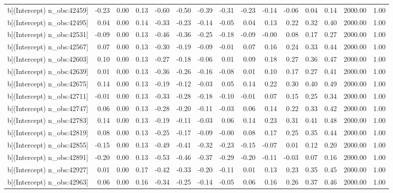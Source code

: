 \begin{table}[ht]
\begin{tabular}{rrrrrrrrrrrrrrr}
  b[(Intercept) n\_obs:42459] & -0.23 & 0.00 & 0.13 & -0.60 & -0.50 & -0.39 & -0.31 & -0.23 & -0.14 & -0.06 & 0.04 & 0.14 & 2000.00 & 1.00 \\ 
  b[(Intercept) n\_obs:42495] & 0.04 & 0.00 & 0.14 & -0.33 & -0.23 & -0.14 & -0.05 & 0.04 & 0.13 & 0.22 & 0.32 & 0.40 & 2000.00 & 1.00 \\ 
  b[(Intercept) n\_obs:42531] & -0.09 & 0.00 & 0.13 & -0.46 & -0.36 & -0.25 & -0.18 & -0.09 & -0.00 & 0.08 & 0.17 & 0.27 & 2000.00 & 1.00 \\ 
  b[(Intercept) n\_obs:42567] & 0.07 & 0.00 & 0.13 & -0.30 & -0.19 & -0.09 & -0.01 & 0.07 & 0.16 & 0.24 & 0.33 & 0.44 & 2000.00 & 1.00 \\ 
  b[(Intercept) n\_obs:42603] & 0.10 & 0.00 & 0.13 & -0.27 & -0.18 & -0.06 & 0.01 & 0.09 & 0.18 & 0.27 & 0.36 & 0.47 & 2000.00 & 1.00 \\ 
  b[(Intercept) n\_obs:42639] & 0.01 & 0.00 & 0.13 & -0.36 & -0.26 & -0.16 & -0.08 & 0.01 & 0.10 & 0.17 & 0.27 & 0.41 & 2000.00 & 1.00 \\ 
  b[(Intercept) n\_obs:42675] & 0.14 & 0.00 & 0.13 & -0.19 & -0.12 & -0.03 & 0.05 & 0.14 & 0.22 & 0.30 & 0.40 & 0.49 & 2000.00 & 1.00 \\ 
  b[(Intercept) n\_obs:42711] & -0.01 & 0.00 & 0.13 & -0.33 & -0.28 & -0.18 & -0.10 & -0.01 & 0.07 & 0.15 & 0.25 & 0.34 & 2000.00 & 1.00 \\ 
  b[(Intercept) n\_obs:42747] & 0.06 & 0.00 & 0.13 & -0.28 & -0.20 & -0.11 & -0.03 & 0.06 & 0.14 & 0.22 & 0.33 & 0.42 & 2000.00 & 1.00 \\ 
  b[(Intercept) n\_obs:42783] & 0.14 & 0.00 & 0.13 & -0.19 & -0.11 & -0.03 & 0.06 & 0.14 & 0.23 & 0.31 & 0.41 & 0.48 & 2000.00 & 1.00 \\ 
  b[(Intercept) n\_obs:42819] & 0.08 & 0.00 & 0.13 & -0.25 & -0.17 & -0.09 & -0.00 & 0.08 & 0.17 & 0.25 & 0.35 & 0.44 & 2000.00 & 1.00 \\ 
  b[(Intercept) n\_obs:42855] & -0.15 & 0.00 & 0.13 & -0.49 & -0.41 & -0.32 & -0.23 & -0.15 & -0.07 & 0.01 & 0.12 & 0.20 & 2000.00 & 1.00 \\ 
  b[(Intercept) n\_obs:42891] & -0.20 & 0.00 & 0.13 & -0.53 & -0.46 & -0.37 & -0.29 & -0.20 & -0.11 & -0.03 & 0.07 & 0.16 & 2000.00 & 1.00 \\ 
  b[(Intercept) n\_obs:42927] & 0.01 & 0.00 & 0.17 & -0.42 & -0.33 & -0.20 & -0.11 & 0.01 & 0.13 & 0.23 & 0.35 & 0.45 & 2000.00 & 1.00 \\ 
  b[(Intercept) n\_obs:42963] & 0.06 & 0.00 & 0.16 & -0.34 & -0.25 & -0.14 & -0.05 & 0.06 & 0.16 & 0.26 & 0.37 & 0.46 & 2000.00 & 1.00 \\ 

\end{tabular}
\end{table}

